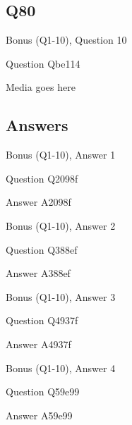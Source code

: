 \documentclass[11pt]{beamer}
\begin{document}
\subsection*{Q80}
\begin{frame}[t]{Bonus (Q1-10), Question 10}
\vspace{2em}
\begin{block}{Question}
Qbe114
\end{block}
\begin{center}
Media goes here
\end{center}
\end{frame}
    
\subsection{Answers}

\begin{frame}[t]{Bonus (Q1-10), Answer 1}
\vspace{2em}
\begin{block}{Question}
Q2098f
\end{block}
\pause{}
\begin{block}{Answer}
A2098f
\end{block}
\end{frame}
    

\begin{frame}[t]{Bonus (Q1-10), Answer 2}
\vspace{2em}
\begin{block}{Question}
Q388ef
\end{block}
\pause{}
\begin{block}{Answer}
A388ef
\end{block}
\end{frame}
    

\begin{frame}[t]{Bonus (Q1-10), Answer 3}
\vspace{2em}
\begin{block}{Question}
Q4937f
\end{block}
\pause{}
\begin{block}{Answer}
A4937f
\end{block}
\end{frame}
    

\begin{frame}[t]{Bonus (Q1-10), Answer 4}
\vspace{2em}
\begin{block}{Question}
Q59e99
\end{block}
\pause{}
\begin{block}{Answer}
A59e99
\end{block}
\end{frame}
    
\end{document}
